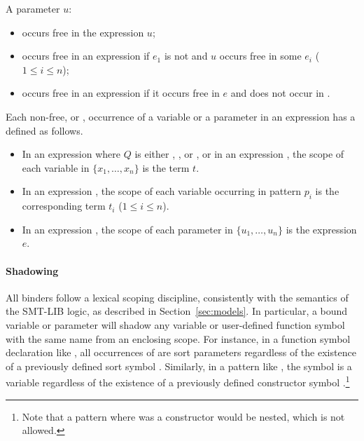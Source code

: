 \noindent A parameter $u$:
\begin{itemize}
\item
occurs free in the expression $u$;
\item
occurs free in an expression 
if $e_1$ is not  and $u$ occurs free in some $e_i$ ($1\le i\le n$); 
\item
occurs free in an expression
if it occurs free in $e$ and does not occur in .
\end{itemize}

\noindent 
Each non-free, or , occurrence of a variable or a parameter 
in an expression has a  defined as follows.

\begin{itemize}
\item
In an expression 
where $Q$ is either , , or , 
or in an expression ,
the scope of each variable in $\{x_1, \ldots, x_n\}$ is the term $t$.
\item
In an expression 
,
the scope of each variable occurring in pattern $p_i$ is the corresponding term $t_i$
($1\le i\le n$).
\item
In an expression 
,
the scope of each parameter in $\{u_1, \ldots, u_n\}$ is the expression $e$.
\end{itemize}

\paragraph{Shadowing}
All binders follow a lexical scoping discipline, 
consistently with the semantics of the SMT-LIB logic,
as described in Section~\ref{sec:models}.
In particular, a bound variable or parameter will shadow any variable or user-defined 
function symbol with the same name from an enclosing scope.
For instance, in a function symbol declaration like
,
all occurrences of  are sort parameters regardless of the existence
of a previously defined sort symbol .
Similarly, in a  pattern like ,
the symbol  is a variable regardless of the existence 
of a previously defined constructor symbol .\footnote{%
Note that a pattern  where  was a constructor
would be nested, which is not allowed. 
}

